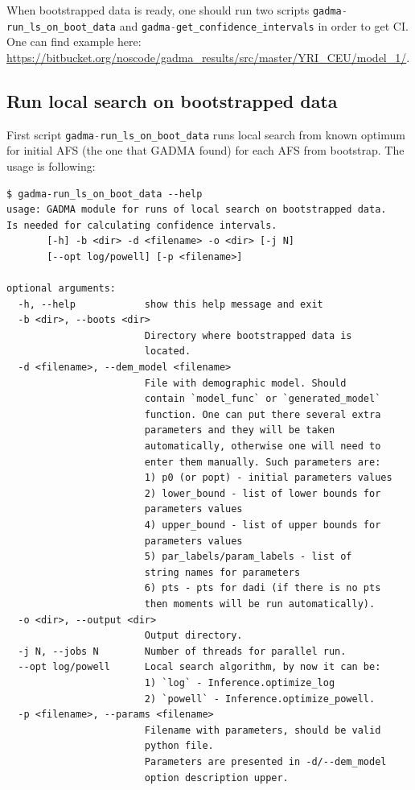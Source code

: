 \documentclass[12pt]{article}
\makeatletter
\newcommand{\py}[1]{\lstinline[language=Python, showstringspaces=False]@#1@}
\makeatother
\begin{document}
When bootstrapped data is ready, one should run two scripts \py{gadma-run_ls_on_boot_data} and \py{gadma-get_confidence_intervals} in order to get CI. One can find example here: \url{https://bitbucket.org/noscode/gadma_results/src/master/YRI_CEU/model_1/}.

\subsection{Run local search on bootstrapped data}
First script \py{gadma-run_ls_on_boot_data} runs local search from known optimum for initial AFS (the one that GADMA found) for each AFS from bootstrap. The usage is following:

\begin{lstlisting}
$ gadma-run_ls_on_boot_data --help
usage: GADMA module for runs of local search on bootstrapped data.
Is needed for calculating confidence intervals.
       [-h] -b <dir> -d <filename> -o <dir> [-j N]
       [--opt log/powell] [-p <filename>]

optional arguments:
  -h, --help            show this help message and exit
  -b <dir>, --boots <dir>
                        Directory where bootstrapped data is 
                        located.
  -d <filename>, --dem_model <filename>
                        File with demographic model. Should 
                        contain `model_func` or `generated_model`
                        function. One can put there several extra
                        parameters and they will be taken 
                        automatically, otherwise one will need to 
                        enter them manually. Such parameters are: 
                        1) p0 (or popt) - initial parameters values 
                        2) lower_bound - list of lower bounds for 
                        parameters values
                        4) upper_bound - list of upper bounds for 
                        parameters values 
                        5) par_labels/param_labels - list of 
                        string names for parameters 
                        6) pts - pts for dadi (if there is no pts
                        then moments will be run automatically).
  -o <dir>, --output <dir>
                        Output directory.
  -j N, --jobs N        Number of threads for parallel run.
  --opt log/powell      Local search algorithm, by now it can be: 
                        1) `log` - Inference.optimize_log 
                        2) `powell` - Inference.optimize_powell.
  -p <filename>, --params <filename>
                        Filename with parameters, should be valid
                        python file.
                        Parameters are presented in -d/--dem_model
                        option description upper.
\end{lstlisting}
\end{document}
